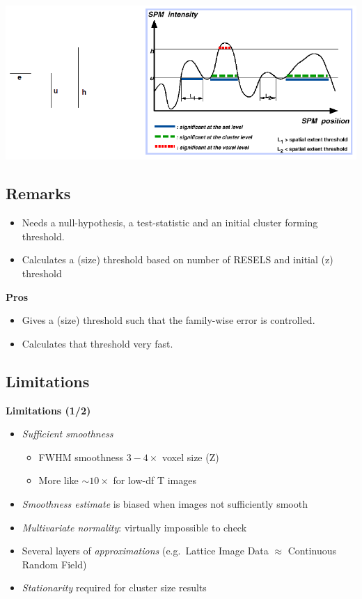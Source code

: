\documentclass[]{article}
\providecommand{\tightlist}{%
  \setlength{\itemsep}{0pt}\setlength{\parskip}{0pt}}
\begin{document}
\begin{center}\includegraphics[width=700px]{./figs/spatial_extent} \end{center}

\subsection{Remarks}\label{remarks}

\begin{itemize}
\tightlist
\item
  Needs a null-hypothesis, a test-statistic and an initial cluster
  forming threshold.
\item
  Calculates a (size) threshold based on number of RESELS and initial
  (z) threshold
\end{itemize}

\textbf{Pros}

\begin{itemize}
\tightlist
\item
  Gives a (size) threshold such that the family-wise error is
  controlled.
\item
  Calculates that threshold very fast.
\end{itemize}

\subsection{Limitations}\label{limitations}

\textbf{Limitations (1/2)}

\begin{itemize}
\tightlist
\item
  \emph{Sufficient smoothness}

  \begin{itemize}
  \tightlist
  \item
    FWHM smoothness \(3-4\times\) voxel size (Z)\\
  \item
    More like \(\sim 10\times\) for low-df T images
  \end{itemize}
\item
  \emph{Smoothness estimate} is biased when images not sufficiently
  smooth
\item
  \emph{Multivariate normality}: virtually impossible to check
\item
  Several layers of \emph{approximations} (e.g.~Lattice Image Data
  \(\approx\) Continuous Random Field)
\item
  \emph{Stationarity} required for cluster size results
\end{itemize}
\end{document}
